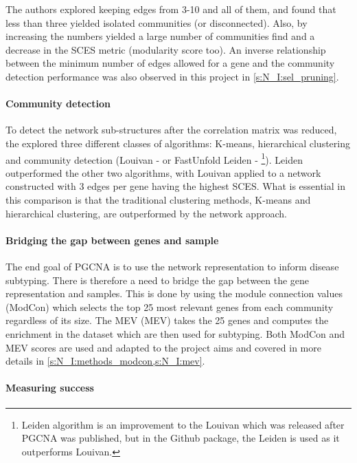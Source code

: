 The authors explored keeping edges from 3-10 and all of them, and found that less than three yielded isolated communities (or disconnected). Also, by increasing the numbers yielded a large number of communities find and a decrease in the SCES metric (modularity score too). An inverse relationship between the minimum number of edges allowed for a gene and the community detection performance was also observed in this project in \cref{s:N_I:sel_pruning}.

\paragraph*{Community detection}

To detect the network sub-structures after the correlation matrix was reduced, the \citet{Care2019-ij} explored three different classes of algorithms: K-means, hierarchical clustering and community detection (Louivan - \cite{Blondel2008-ik} or FastUnfold Leiden - \cite{Traag2019-ne}\footnote{Leiden algorithm is an improvement to the Louivan which was released after PGCNA was published, but in the Github package, the Leiden is used as it outperforms Louivan.}). Leiden outperformed the other two algorithms, with Louivan applied to a network constructed with 3 edges per gene having the highest SCES. What is essential in this comparison is that the traditional clustering methods, K-means and hierarchical clustering, are outperformed by the network approach.

\paragraph*{Bridging the gap between genes and sample}

The end goal of PGCNA is to use the network representation to inform disease subtyping. There is therefore a need to bridge the gap between the gene representation and samples. This is done by using the module connection values (ModCon) which selects the top 25 most relevant genes from each community regardless of its size. The \gls{MEV} (MEV) takes the 25 genes and computes the enrichment in the dataset which are then used for subtyping. Both ModCon and MEV scores are used and adapted to the project aims and covered in more details in \cref{s:N_I:methods_modcon,s:N_I:mev}.

\paragraph*{Measuring success} 

